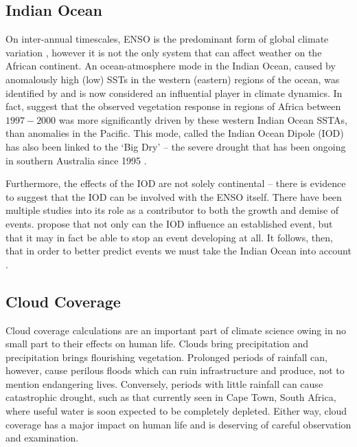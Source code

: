 \subsection{Indian Ocean}

On inter-annual timescales, ENSO is the predominant form of global climate
variation \citep{obrien1998}, however it is not the only system that can affect
weather on the African continent. An ocean-atmosphere mode in the Indian Ocean,
caused by anomalously high (low) SSTs in the western (eastern) regions of the
ocean, was identified by \cite{saji1999} and is now considered an influential
player in climate dynamics. In fact, \cite{anyamba2002} suggest that the
observed vegetation response in regions of Africa between $1997-2000$ was more
significantly driven by these western Indian Ocean SSTAs, than anomalies
in the Pacific. This mode, called the Indian Ocean Dipole (IOD) has also been
linked to the `Big Dry' -- the severe drought that has been ongoing in southern
Australia since 1995 \citep{karumuri2003, ummenhofer2009}.

Furthermore, the effects of the IOD are not solely continental -- there is
evidence to suggest that the IOD can be involved with the ENSO itself. There
have been multiple studies into its role as a contributor to both the growth
\citep{annamalai2005, hackert2017} and demise \citep{okumura2010, kug2006,
  xie2009, dayan2015} of \elnino{} events. \cite{dong2018} propose that not only
can the IOD influence an established \elnino{} event, but that it may in fact be
able to stop an \elnino{} event developing at all. It follows, then, that in
order to better predict \elnino{} events we must take the Indian Ocean into
account \citep{hackert2017}.

\subsection{Cloud Coverage}
\label{sec:intro:cc}
Cloud coverage calculations are an important part of climate science owing in no
small part to their effects on human life. Clouds bring precipitation and
precipitation brings flourishing vegetation. Prolonged periods of rainfall can,
however, cause perilous floods which can ruin infrastructure and produce, not to
mention endangering lives. Conversely, periods with little rainfall can cause
catastrophic drought, such as that currently seen in Cape Town, South Africa,
where useful water is soon expected to be completely depleted. Either way, cloud
coverage has a major impact on human life and is deserving of careful
observation and examination.

